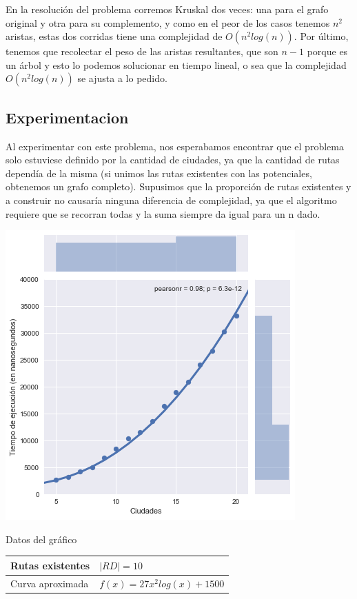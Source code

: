 En la resolución del problema corremos Kruskal dos veces: una para el grafo original y otra para su complemento, y como en el peor de los casos tenemos $n^2$ aristas, estas dos corridas tiene una complejidad de $O(n^2log(n))$. Por último, tenemos que recolectar el peso de las aristas resultantes, que son $n-1$ porque es un árbol y esto lo podemos solucionar en tiempo lineal, o sea que la complejidad $O(n^2log(n))$ se ajusta a lo pedido.


\subsection{Experimentacion}

Al experimentar con este problema, nos esperabamos encontrar que el problema solo estuviese definido por la cantidad de ciudades, ya que la cantidad de rutas dependía de la misma (si unimos las rutas existentes con las potenciales, obtenemos un grafo completo). Supusimos que la proporción de rutas existentes y a construir no causaría ninguna diferencia de complejidad, ya que el algoritmo requiere que se recorran todas y la suma siempre da igual para un n dado.

\noindent
\begin{minipage}{0.55\textwidth}
	\hfill
	\includegraphics[scale=0.60]{imagenes/ej3-1.png}
\end{minipage}
\hfill
\begin{minipage}{0.44\textwidth}
	\begin{center}
		Datos del gráfico

		\begin{tabular}{ | l l |}
			\hline
			Rutas existentes & $| RD | = 10$ \\ \hline
			Curva aproximada & $f(x) = 27 x^2 log(x) + 1500$ \\
			\hline
		\end{tabular}
	\end{center}
\end{minipage}

